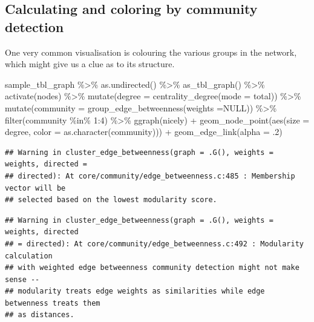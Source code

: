 \documentclass[
]{book}
\newenvironment{Shaded}{\begin{snugshade}}{\end{snugshade}}
\newcommand{\AttributeTok}[1]{\textcolor[rgb]{0.77,0.63,0.00}{#1}}
\newcommand{\ConstantTok}[1]{\textcolor[rgb]{0.00,0.00,0.00}{#1}}
\newcommand{\DecValTok}[1]{\textcolor[rgb]{0.00,0.00,0.81}{#1}}
\newcommand{\FunctionTok}[1]{\textcolor[rgb]{0.00,0.00,0.00}{#1}}
\newcommand{\NormalTok}[1]{#1}
\newcommand{\SpecialCharTok}[1]{\textcolor[rgb]{0.00,0.00,0.00}{#1}}
\newcommand{\StringTok}[1]{\textcolor[rgb]{0.31,0.60,0.02}{#1}}
\begin{document}
\hypertarget{calculating-and-coloring-by-community-detection}{%
\subsection{Calculating and coloring by community detection}\label{calculating-and-coloring-by-community-detection}}

One very common visualisation is colouring the various groups in the network, which might give us a clue as to its structure.

\begin{Shaded}
\begin{Highlighting}[]
\NormalTok{sample\_tbl\_graph }\SpecialCharTok{\%\textgreater{}\%} 
  \FunctionTok{as.undirected}\NormalTok{() }\SpecialCharTok{\%\textgreater{}\%} 
  \FunctionTok{as\_tbl\_graph}\NormalTok{() }\SpecialCharTok{\%\textgreater{}\%} 
  \FunctionTok{activate}\NormalTok{(nodes) }\SpecialCharTok{\%\textgreater{}\%} 
  \FunctionTok{mutate}\NormalTok{(}\AttributeTok{degree =} \FunctionTok{centrality\_degree}\NormalTok{(}\AttributeTok{mode =} \StringTok{\textquotesingle{}total\textquotesingle{}}\NormalTok{))  }\SpecialCharTok{\%\textgreater{}\%} 
  \FunctionTok{mutate}\NormalTok{(}\AttributeTok{community =} \FunctionTok{group\_edge\_betweenness}\NormalTok{(}\AttributeTok{weights =}\ConstantTok{NULL}\NormalTok{)) }\SpecialCharTok{\%\textgreater{}\%} 
  \FunctionTok{filter}\NormalTok{(community }\SpecialCharTok{\%in\%} \DecValTok{1}\SpecialCharTok{:}\DecValTok{4}\NormalTok{) }\SpecialCharTok{\%\textgreater{}\%} 
  \FunctionTok{ggraph}\NormalTok{(}\StringTok{\textquotesingle{}nicely\textquotesingle{}}\NormalTok{) }\SpecialCharTok{+} 
  \FunctionTok{geom\_node\_point}\NormalTok{(}\FunctionTok{aes}\NormalTok{(}\AttributeTok{size =}\NormalTok{ degree, }\AttributeTok{color =} \FunctionTok{as.character}\NormalTok{(community))) }\SpecialCharTok{+} 
  \FunctionTok{geom\_edge\_link}\NormalTok{(}\AttributeTok{alpha =}\NormalTok{ .}\DecValTok{2}\NormalTok{)}
\end{Highlighting}
\end{Shaded}

\begin{verbatim}
## Warning in cluster_edge_betweenness(graph = .G(), weights = weights, directed =
## directed): At core/community/edge_betweenness.c:485 : Membership vector will be
## selected based on the lowest modularity score.
\end{verbatim}

\begin{verbatim}
## Warning in cluster_edge_betweenness(graph = .G(), weights = weights, directed
## = directed): At core/community/edge_betweenness.c:492 : Modularity calculation
## with weighted edge betweenness community detection might not make sense --
## modularity treats edge weights as similarities while edge betwenness treats them
## as distances.
\end{verbatim}
\end{document}
